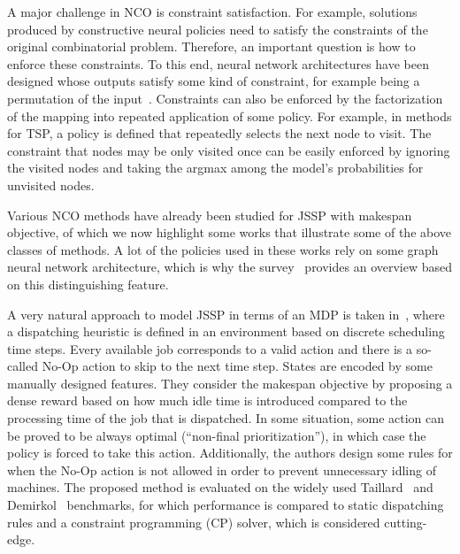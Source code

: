 \documentclass[a4paper]{article}
\theoremstyle{definition}
\theoremstyle{plain}
\begin{document}


A major challenge in NCO is constraint
satisfaction. For example, solutions produced by constructive neural policies
need to satisfy the constraints of the original combinatorial problem.
Therefore, an important question is how to enforce these constraints. To this
end, neural network architectures have been designed whose outputs satisfy some
kind of constraint, for example being a permutation of the
input~\cite{vinyalsPointerNetworks2017a}. Constraints can also be enforced by
the factorization of the mapping into repeated application of some policy. For
example, in methods for TSP, a policy is defined that repeatedly selects the
next node to visit. The constraint that nodes may be only visited once can be
easily enforced by ignoring the visited nodes and taking the argmax among the
model's probabilities for unvisited nodes.




Various NCO methods have already been studied for JSSP with makespan objective,
of which we now highlight some works that illustrate some of the above classes
of methods. A lot of the policies used in these works rely on some graph neural
network architecture, which is why the survey~\cite{smitGraphNeuralNetworks2024}
provides an overview based on this distinguishing feature.

A very natural approach to model JSSP in terms of an MDP is taken
in~\cite{tasselReinforcementLearningEnvironment2021}, where a dispatching
heuristic is defined in an environment based on discrete scheduling time steps.
%
Every available job corresponds to a valid action and there is a so-called No-Op
action to skip to the next time step. States are encoded by some manually
designed features. They consider the makespan objective by proposing a dense
reward based on how much idle time is introduced compared to the processing time
of the job that is dispatched.
%
In some situation, some action can be proved to be always optimal (``non-final
prioritization''), in which case the policy is forced to take this action.
Additionally, the authors design some rules for when the No-Op action is not
allowed in order to prevent unnecessary idling of machines.
%
The proposed method is evaluated on the widely used
Taillard~\cite{taillardBenchmarksBasicScheduling1993} and
Demirkol~\cite{DEMIRKOL1998137} benchmarks, for which performance is compared to
static dispatching rules and a constraint programming (CP) solver, which is
considered cutting-edge.
\end{document}
